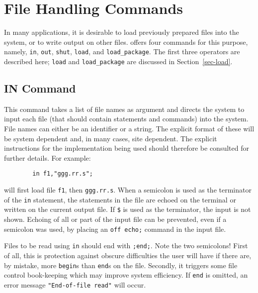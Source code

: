 \chapter{File Handling Commands}

In many applications, it is desirable to load previously prepared {\REDUCE}
files into the system, or to write output on other files. {\REDUCE} offers
four commands for this purpose, namely, \texttt{in}, \texttt{out}, \texttt{shut},
\texttt{load}, and \texttt{load\_package}.
The first three operators are described here; \texttt{load} and
\texttt{load\_package} are discussed in Section~\ref{sec-load}.

\section{IN Command}
\hypertarget{command:IN}{}
\hypertarget{switch:ECHO}{}
\hypertarget{reserved:__FILE__}{}
\hypertarget{reserved:__LINE__}{}
This command takes a list of file names as argument and directs the system
to input each file (that should contain {\REDUCE} statements
and commands) into the system.  File names can either be an identifier or
a string.  The explicit format of these will be system dependent and, in
many cases, site dependent.  The explicit instructions for the
implementation being used should therefore be consulted for further
details. For example:
\begin{verbatim}
        in f1,"ggg.rr.s";
\end{verbatim}
will first load file \texttt{f1}, then \texttt{ggg.rr.s}.  When a semicolon is
used as the terminator of the \texttt{in} statement, the statements in the file are
echoed on the terminal or written on the current output file.  If \texttt{\$}
 is used as the terminator, the input is not
shown.  Echoing of all or part of the input file can be prevented, even if
a semicolon was used, by placing an \texttt{off echo;} command
in the input file.

Files to be read using \texttt{in} should end with \texttt{;end;}.  Note the two
semicolons!  First of all, this is protection against obscure difficulties
the user will have if there are, by mistake, more \texttt{begin}s than
\texttt{end}s on the file.  Secondly, it triggers some file control book-keeping
which may improve system efficiency.  If \texttt{end} is omitted, an error
message \texttt{"End-of-file read"} will occur.

